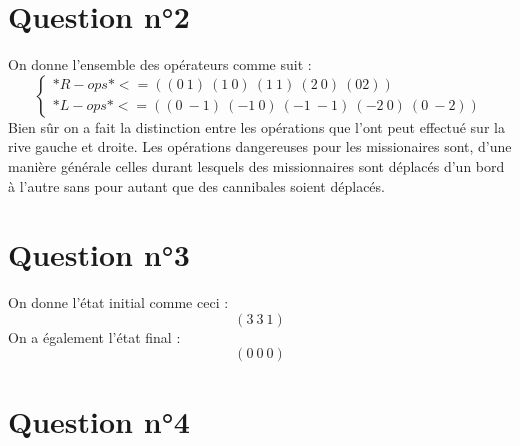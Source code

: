 \documentclass[a4paper, 12pt, leqno]{report}
\theoremstyle{plain}
\begin{document}
		\section{Question n°2}     
            On donne l'ensemble des opérateurs comme suit :
               $$
               \left\{
    \begin{array}{ll}
    *R-ops* <= ((0\ 1)\ (1\ 0)\ (1\ 1)\ (2\ 0)\ (0 2))\\     
                *L-ops* <= ((0\ -1)\ (-1\ 0)\ (-1\ -1)\ (-2\ 0)\ (0\ -2))
    \end{array}
    \right.
    $$
    Bien sûr on a fait la distinction entre les opérations que l'ont peut effectué sur la rive gauche et droite. Les opérations dangereuses pour les missionaires sont, d'une manière générale celles durant lesquels des missionnaires sont déplacés d'un bord à l'autre sans pour autant que des cannibales soient déplacés. 
        
        \newpage
        \section{Question n°3} 
        On donne l'état initial comme ceci :
            \[(3\ 3\ 1)\]
            On a également l'état final :
            \[(0\ 0\ 0)\]
            
            \section{Question n°4}
            
\end{document}
